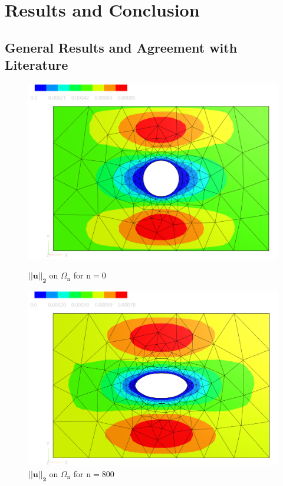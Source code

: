 \section{Results and Conclusion}
\subsection{General Results and Agreement with Literature}
\begin{figure}[h]
\begin{minipage}{.5\textwidth}
    \centering
    \includegraphics[width=1\textwidth]{figures/u_0.PNG}
    \caption{ $\mathbf{||u||_2}$ on $\Omega_{\mathrm{n}}$ for $\mathrm{n}=0$}
    \label{plot_ref_u_0}
\end{minipage}
\begin{minipage}{.5\textwidth}
    \centering
    \includegraphics[width=1\textwidth]{figures/u_final.PNG}
    \caption{ $\mathbf{||u||_2}$ on $\Omega_{\mathrm{n}}$ for $\mathrm{n}=800$}
    \label{plot_ref_u_final}
\end{minipage}
\end{figure}

